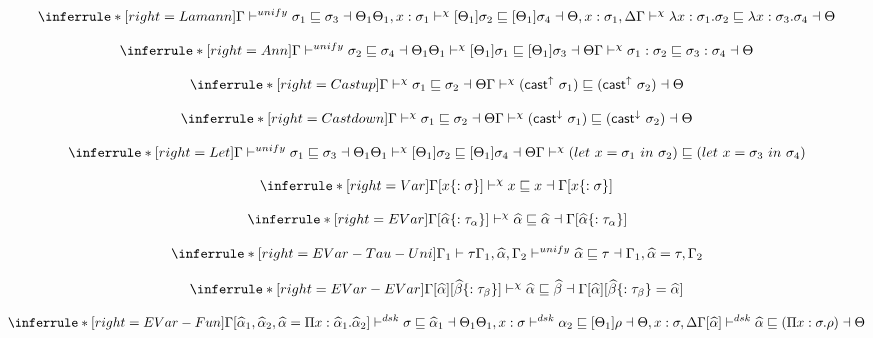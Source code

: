 \[
\inferrule*[right=Lamann]
{
\Gamma \unify \sigma_1 \sqsubseteq \sigma_3 \dashv \Theta_1 \\
\Theta_1, x:\sigma_1 \dskunify [\Theta_1]\sigma_2 \sqsubseteq [\Theta_1]\sigma_4 \dashv \Theta, x:\sigma_1, \Delta }
{\Gamma \dskunify \lambda x:\sigma_1. \sigma_2 \sqsubseteq \lambda x:\sigma_3. \sigma_4 \dashv \Theta
}
\]

\[
\inferrule*[right=Ann]
{
\Gamma \unify \sigma_2 \sqsubseteq \sigma_4 \dashv \Theta_1 \\
\Theta_1 \dskunify  [\Theta_1]\sigma_1 \sqsubseteq [\Theta_1]\sigma_3 \dashv \Theta }
{\Gamma \dskunify \sigma_1:\sigma_2 \sqsubseteq \sigma_3:\sigma_4 \dashv \Theta}
\]

\[
\inferrule*[right=Castup]
{
\Gamma \dskunify  \sigma_1 \sqsubseteq \sigma_2 \dashv \Theta}
{\Gamma \dskunify (\castupe \sigma_1) \sqsubseteq  (\castupe \sigma_2) \dashv \Theta}
\]

\[
\inferrule*[right=Castdown]
{
\Gamma \dskunify  \sigma_1 \sqsubseteq \sigma_2 \dashv \Theta}
{\Gamma \dskunify  (\castdowne \sigma_1) \sqsubseteq  (\castdowne \sigma_2) \dashv \Theta}
\]

\[
\inferrule*[right=Let]
{
\Gamma \unify \sigma_1 \sqsubseteq \sigma_3 \dashv \Theta_1 \\
\Theta_1 \dskunify  [\Theta_1]\sigma_2 \sqsubseteq [\Theta_1]\sigma_4 \dashv \Theta }
{\Gamma \dskunify  (let\ x = \sigma_1\ in\ \sigma_2) \sqsubseteq  (let\ x = \sigma_3\ in\ \sigma_4) }
\]

\[
\inferrule*[right=Var]
{ }
{\Gamma[x\{:\sigma\}] \dskunify x \sqsubseteq x \dashv \Gamma[x\{:\sigma\}] }
\]

\[
\inferrule*[right=EVar]
{ }
{\Gamma[\widehat \alpha\{:\tau_\alpha\} ] \dskunify \widehat \alpha \sqsubseteq \widehat \alpha \dashv \Gamma[\widehat \alpha\{:\tau_\alpha\}] }
\]



\[
\inferrule*[right=EVar-Tau-Uni]
{ \Gamma_1 \vdash \tau}
{\Gamma_1, \widehat \alpha, \Gamma_2 \unify \widehat \alpha \sqsubseteq \tau \dashv \Gamma_1, \widehat \alpha=\tau, \Gamma_2}
\]

\[
\inferrule*[right=EVar-EVar]
{ }
{\Gamma[\widehat \alpha][\widehat \beta\{:\tau_\beta\}] \dskunify \widehat \alpha \sqsubseteq \widehat \beta \dashv
\Gamma[\widehat \alpha][\widehat \beta\{:\tau_\beta\} = \widehat \alpha] }
\]

\[
\inferrule*[right=EVar-Fun]
{\Gamma[\widehat \alpha_1, \widehat \alpha_2, \widehat \alpha = \Pi x: \widehat \alpha_1. \widehat \alpha_2]
    \dsk  \sigma \sqsubseteq \widehat \alpha_1 \dashv \Theta_1 \\
\Theta_1, x: \sigma \dsk \alpha_2 \sqsubseteq [\Theta_1] \rho \dashv \Theta, x:\sigma, \Delta}
{\Gamma[\widehat \alpha] \dsk \widehat \alpha \sqsubseteq (\Pi x:\sigma. \rho) \dashv \Theta}
\]

